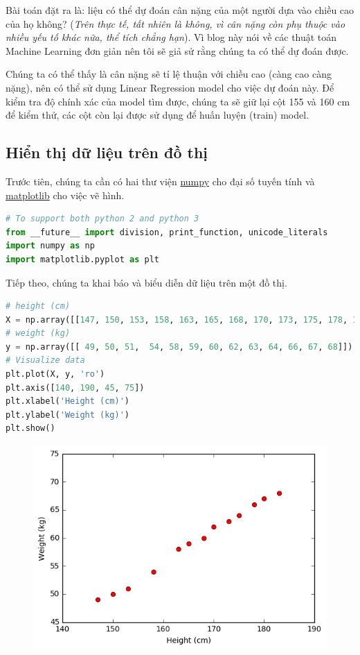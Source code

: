 
Bài toán đặt ra là: liệu có thể dự đoán cân nặng của một người dựa vào chiều cao của họ không? (\textit{Trên thực tế, tất nhiên là không, vì cân nặng còn phụ thuộc vào nhiều yếu tố khác nữa, thể tích chẳng hạn}). Vì blog này nói về các thuật toán Machine Learning đơn giản nên tôi sẽ giả sử rằng chúng ta có thể dự đoán được. 
 
Chúng ta có thể thấy là cân nặng sẽ tỉ lệ thuận với chiều cao (càng cao càng nặng), nên có thể sử dụng Linear Regression model cho việc dự đoán này. Để kiểm tra độ chính xác của model tìm được, chúng ta sẽ giữ lại cột 155 và 160 cm để kiểm thử, các cột còn lại được sử dụng để huấn luyện (train) model. 
 
 
\subsection{Hiển thị dữ liệu trên đồ thị}
Trước tiên, chúng ta cần có hai thư viện \href{http://www.numpy.org/}{numpy} cho đại số tuyến tính và \href{http://matplotlib.org/}{matplotlib} cho việc vẽ hình.  
 
 
\begin{lstlisting}[language=Python]
# To support both python 2 and python 3 
from __future__ import division, print_function, unicode_literals 
import numpy as np  
import matplotlib.pyplot as plt 
\end{lstlisting}
 
Tiếp theo, chúng ta khai báo và biểu diễn dữ liệu trên một đồ thị. 
 
 
\begin{lstlisting}[language=Python]
# height (cm) 
X = np.array([[147, 150, 153, 158, 163, 165, 168, 170, 173, 175, 178, 180, 183]]).T 
# weight (kg) 
y = np.array([[ 49, 50, 51,  54, 58, 59, 60, 62, 63, 64, 66, 67, 68]]).T 
# Visualize data  
plt.plot(X, y, 'ro') 
plt.axis([140, 190, 45, 75]) 
plt.xlabel('Height (cm)') 
plt.ylabel('Weight (kg)') 
plt.show() 
\end{lstlisting}
 
 
 
 \begin{figure}
 	\centering	
 	\includegraphics[width = \textwidth]{../LR/output_3_0.png}
 \end{figure}
 
